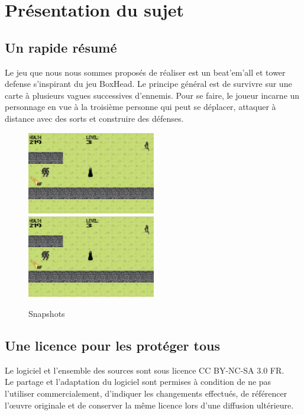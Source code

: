 \section{Présentation du sujet} %

\subsection{Un rapide résumé}
Le jeu que nous nous sommes proposés de réaliser est un beat’em’all et tower defense s’inspirant du jeu BoxHead. Le
principe général est de survivre sur une carte à plusieurs vagues successives d’ennemis. Pour se faire,
le joueur incarne un personnage en vue à la troisième personne qui peut se déplacer, attaquer à distance avec des sorts 
et construire des défenses.

\begin{figure}
    \includegraphics[width=0.5\textwidth]{./images/snapshot1.png}
    \includegraphics[width=0.5\textwidth]{./images/snapshot1.png}
    \caption{Snapshots}
\end{figure}

\subsection{Une licence pour les protéger tous}

Le logiciel et l'ensemble des sources sont sous licence CC BY-NC-SA 3.0 FR. \\
Le partage et l'adaptation du logiciel sont permises à condition de ne pas l'utiliser
commercialement, d'indiquer les changements effectués, de référencer l’œuvre originale et 
de conserver la même licence lors d'une diffusion ultérieure.

